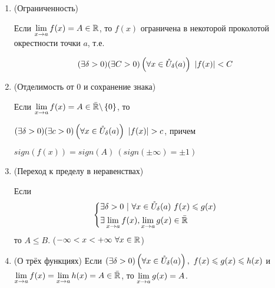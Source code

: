 \begin{enumerate}
	\item (Ограниченность)
	
	Если $\lim\limits_{x \rightarrow a} f(x) = A \in \mathbb{R}$, то $f(x)$ ограничена в
	некоторой проколотой окрестности точки $a$, т.е.

	\[
		(\exists \delta > 0)(\exists C > 0)
		\left(\forall x \in \mathring{U}_\delta(a)\right)\ |f(x)| < C
	\]
	
	\item (Отделимость от 0 и сохранение знака)
	
	Если $\lim\limits_{x \rightarrow a} f(x) = A \in \bar{\mathbb{R}}
	\backslash \left\{0\right\}$, то 

	$(\exists \delta > 0)(\exists c > 0)
 	\left(\forall x \in \mc{U}_{\delta}(a)\right)\ 
	|f(x)| > c$, причем 
		
	$sign(f(x)) = sign(A)
    \ (sign(\pm \infty) = \pm 1)$

	\item (Переход к пределу в неравенствах) 
	
	Если 
	$$
	\left\{\begin{aligned}
		&{\exists \delta > 0\ |\ \forall x \in \mathring{U}_{\delta}(a)\ f(x) \leqslant g(x)}
		\\
		&{\exists \lim\limits_{x \rightarrow a} f(x), \lim\limits_{x \rightarrow a} g(x) \in \bar{\mathbb{R}}}
	\end{aligned}\right.
	$$
	то $A \le B$. ($-\infty < x < +\infty \ \forall x \in \mathbb{R}$)
	
	\item (О трёх функциях) Если $(\exists \delta > 0)\left(\forall x \in \mathring{U}_{\delta}(a)\right),\ f(x) \leqslant g(x) \leqslant h(x)$ и $\lim\limits_{x \rightarrow a} f(x) = \lim\limits_{x \rightarrow a} h(x) = A \in \bar{\mathbb{R}}$, то $\lim\limits_{x \rightarrow a} g(x) = A$.
\end{enumerate}

